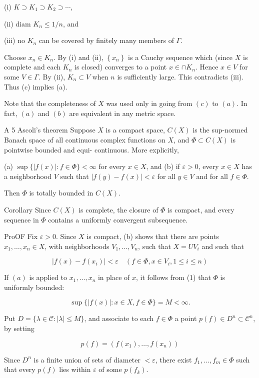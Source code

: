 \documentclass[10pt]{article}
\begin{document}
(i) $K \supset K_{1} \supset K_{2} \supset \cdots$,

(ii) diam $K_{n} \leq 1 / n$, and

(iii) no $K_{n}$ can be covered by finitely many members of $\Gamma$.

Choose $x_{n} \in K_{n}$. By (i) and (ii), $\left\{x_{n}\right\}$ is a Cauchy sequence which (since $X$ is complete and each $K_{n}$ is closed) converges to a point $x \in \cap K_{n}$. Hence $x \in V$ for some $V \in \Gamma$. By (ii), $K_{n} \subset V$ when $n$ is sufficiently large. This contradicts (iii). Thus (c)
implies (a).

Note that the completeness of $X$ was used only in going from $(c)$ to $(a)$. In fact, $(a)$ and $(b)$ are equivalent in any metric space.

A 5 Ascoli's theorem Suppose $X$ is a compact space, $C(X)$ is the sup-normed Banach space of all continuous complex functions on $X$, and $\Phi \subset C(X)$ is pointwise bounded and equi-
continuous. More explicitly,

(a) $\sup \{|f(x)|: f \in \Phi\}<\infty$ for every $x \in X$, and (b) if $\varepsilon>0$, every $x \in X$ has a neighborhood $V$ such that $|f(y)-f(x)|<\varepsilon$ for all $y \in V$ and
for all $f \in \Phi$.

Then $\Phi$ is totally bounded in $C(X)$.

Corollary Since $C(X)$ is complete, the closure of $\Phi$ is compact, and every sequence in $\Phi$ contains a uniformly convergent subsequence.

ProOF Fix $\varepsilon>0$. Since $X$ is compact, (b) shows that there are points $x_{1}, \ldots, x_{n} \in X$, with neighborhoods $V_{1}, \ldots, V_{n}$, such that $X=U V_{i}$ and such that

$$
\left|f(x)-f\left(x_{i}\right)\right|<\varepsilon \quad\left(f \in \Phi, x \in V_{i}, 1 \leq i \leq n\right)
$$

If $(a)$ is applied to $x_{1}, \ldots, x_{n}$ in place of $x$, it follows from (1) that $\Phi$ is uniformly bounded:

$$
\sup \{|f(x)|: x \in X, f \in \Phi\}=M<\infty .
$$

Put $D=\{\lambda \in \mathscr{C}:|\lambda| \leq M\}$, and associate to each $f \in \Phi$ a point $p(f) \in D^{n} \subset \mathscr{C}^{n}$, by setting

$$
p(f)=\left(f\left(x_{1}\right), \ldots, f\left(x_{n}\right)\right)
$$

Since $D^{n}$ is a finite union of sets of diameter $<\varepsilon$, there exist $f_{1}, \ldots, f_{m} \in \Phi$ such that every $p(f)$ lies within $\varepsilon$ of some $p\left(f_{k}\right)$.
\end{document}
